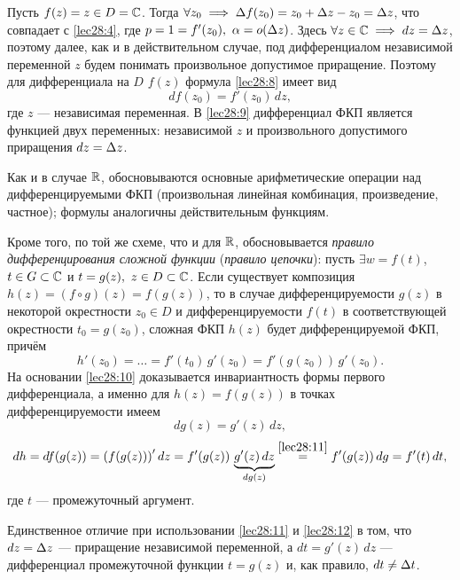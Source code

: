 \documentclass[../../main.tex]{subfiles}
\begin{document}
\begin{exmp}
Пусть $f(z) = z \in D = \mathbb{C}$. Тогда $\forall z_0 \implies
\Delta f(z_0) = z_0 + \Delta z - z_0 = \Delta z$, что совпадает с \eqref{lec28:4},
где $p = 1 = f'(z_0),\ \alpha = o(\Delta z)$.
Здесь $\forall z \in \mathbb{C} \implies dz = \Delta z$,
поэтому далее, как и в действительном случае, под дифференциалом
независимой переменной $z$ будем понимать произвольное допустимое приращение.
Поэтому для дифференциала на $D$ $f(z)$ формула \eqref{lec28:8} имеет вид
\begin{equation}
\label{lec28:9}
d f(z_0) = f'(z_0)\, dz,
\end{equation}
где $z$ --- независимая переменная.
В \eqref{lec28:9} дифференциал ФКП является функцией двух переменных:
независимой $z$ и произвольного допустимого приращения $dz = \Delta z$.
\end{exmp}

Как и в случае $\mathbb{R}$, обосновываются основные арифметические операции над
дифференцируемыми ФКП (произвольная линейная комбинация, произведение, 
частное);
формулы аналогичны действительным функциям.

Кроме того, по той же схеме, что и для $\mathbb{R}$, обосновывается \emph{правило
дифференцирования сложной функции} (\emph{правило цепочки}):
пусть $\exists w = f(t)$, $t \in G \subset \mathbb{C}$ и
$t = g(z),\ z \in D \subset \mathbb{C}$.
Если существует композиция $h(z) = \left(f \circ g\right) (z) =
f(g(z))$, то в случае дифференцируемости $g(z)$
в некоторой окрестности $z_0 \in D$ и дифференцируемости $f(t)$ в 
соответствующей окрестности $t_0 = g(z_0)$, сложная ФКП $h(z)$ будет
дифференцируемой ФКП, причём
\begin{equation}
\label{lec28:10}
h'(z_0) = \ldots = f'(t_0)\, g'(z_0) = f'(g(z_0))\, g'(z_0).
\end{equation}
На основании \eqref{lec28:10} доказывается инвариантность формы
первого дифференциала, а именно для $h(z) = f(g(z))$ в точках 
дифференцируемости
имеем
\begin{equation}
\label{lec28:11}
d g(z) = g'(z)\, dz,
\end{equation}
\begin{equation}
\label{lec28:12}
dh = d f(g(z)) = \left(f(g(z))\right)' dz = f'(g(z))\,
\underbrace{g'(z)\, dz}_{d g(z)} \stk{lec28:11}{=} f'(g(z))\, dg = f'(t)\, dt,
\end{equation}
где $t$ --- промежуточный аргумент.

Единственное отличие при использовании \eqref{lec28:11} и \eqref{lec28:12}
в том, что $dz = \Delta z$ --- приращение независимой переменной,
а $dt = g'(z)\, dz$ --- дифференциал промежуточной функции $t = g(z)$ и,
как правило, $dt \ne \Delta t$.
\end{document}
